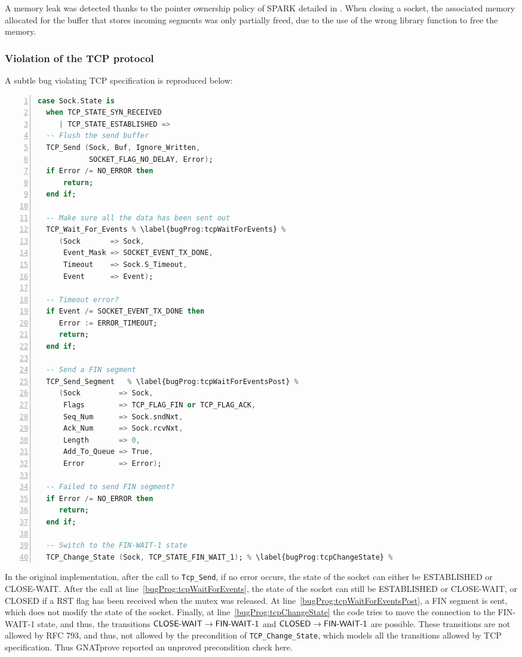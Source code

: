 \documentclass[conference]{IEEEtran}
\def\spark#1{\lstinline[language=Ada]{#1}}
\def\state#1{\textsf{\MakeUppercase{#1}}\xspace}
\def\sclosed{\state{closed}}
\def\sestab{\state{established}}
\def\sfwone{\state{fin-wait-1}}
\def\sclosew{\state{close-wait}}
\def\flag#1{\textsf{#1}\xspace}
\def\rst{\flag{RST}}
\def\fin{\flag{FIN}}
\begin{document}
A memory leak was detected thanks to the pointer ownership policy of SPARK
detailed in . When closing a socket, the associated memory
allocated for the buffer that stores incoming segments was only partially
freed, due to the use of the wrong library function to free the memory.

\subsubsection{Violation of the TCP protocol}

A subtle bug violating TCP specification is reproduced below:

\begin{lstlisting}[language=Ada, basicstyle=\footnotesize\ttfamily,
                    numbers=left, numberstyle=\tiny, escapechar=\%,
                    numbersep=0pt]
case Sock.State is
  when TCP_STATE_SYN_RECEIVED
     | TCP_STATE_ESTABLISHED =>
  -- Flush the send buffer
  TCP_Send (Sock, Buf, Ignore_Written,
            SOCKET_FLAG_NO_DELAY, Error);
  if Error /= NO_ERROR then
      return;
  end if;

  -- Make sure all the data has been sent out
  TCP_Wait_For_Events % \label{bugProg:tcpWaitForEvents} %
     (Sock       => Sock,
      Event_Mask => SOCKET_EVENT_TX_DONE,
      Timeout    => Sock.S_Timeout,
      Event      => Event);

  -- Timeout error?
  if Event /= SOCKET_EVENT_TX_DONE then
     Error := ERROR_TIMEOUT;
     return;
  end if;

  -- Send a FIN segment
  TCP_Send_Segment   % \label{bugProg:tcpWaitForEventsPost} %
     (Sock         => Sock,
      Flags        => TCP_FLAG_FIN or TCP_FLAG_ACK,
      Seq_Num      => Sock.sndNxt,
      Ack_Num      => Sock.rcvNxt,
      Length       => 0,
      Add_To_Queue => True,
      Error        => Error);

  -- Failed to send FIN segment?
  if Error /= NO_ERROR then
     return;
  end if;

  -- Switch to the FIN-WAIT-1 state
  TCP_Change_State (Sock, TCP_STATE_FIN_WAIT_1); % \label{bugProg:tcpChangeState} %
\end{lstlisting}

In the original implementation, after the call to \spark{Tcp_Send}, if no error occurs, the state of the socket can either be \sestab or \sclosew. After the call at line~\ref{bugProg:tcpWaitForEvents}, the state of the socket can still be \sestab or \sclosew, or \sclosed if a \rst flag has been received when the mutex was released. At line~\ref{bugProg:tcpWaitForEventsPost}, a \fin segment is sent, which does not modify the state of the socket. Finally, at line~\ref{bugProg:tcpChangeState} the code tries to move the connection to the \sfwone state, and thus, the transitions $\text{\sclosew} \rightarrow \text{\sfwone}$ and $\text{\sclosed} \rightarrow \text{\sfwone}$ are possible.
These transitions are not allowed by RFC 793, and thus, not allowed by the precondition of \spark{TCP_Change_State}, which models all the transitions allowed by TCP specification. Thus GNATprove reported an unproved precondition check here.
\end{document}
